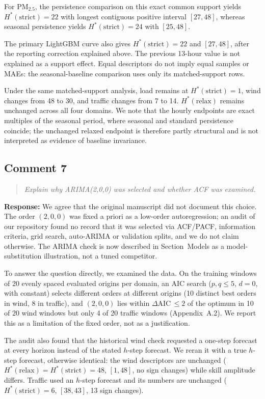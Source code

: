 \documentclass[11pt,a4paper]{article}
\let\originalsubsection\subsection
\renewcommand{\subsection}{\Needspace{9\baselineskip}\originalsubsection}
\newenvironment{reviewcomment}
  {\begin{quote}\itshape}
  {\end{quote}}
\newcommand{\response}{\noindent\textbf{Response:} }
\begin{document}
For PM$_{2.5}$, the persistence comparison on this exact common support yields
$H^*(\mathrm{strict})=22$ with longest contiguous positive interval $[27,48]$,
whereas seasonal persistence yields $H^*(\mathrm{strict})=24$ with $[25,48]$.

The primary LightGBM curve also gives $H^*(\mathrm{strict})=22$ and
$[27,48]$, after the reporting correction explained above. The previous
13-hour value is not explained as a support effect. Equal descriptors
do not imply equal samples or MAEs: the seasonal-baseline comparison
uses only its matched-support rows.

Under the same matched-support analysis, load remains at
$H^*(\mathrm{strict})=1$, wind changes from 48 to 30, and traffic changes from
7 to 14. $H^*(\mathrm{relax})$ remains unchanged across all four domains. We
note that the hourly endpoints are exact multiples of the seasonal period,
where seasonal and standard persistence coincide; the unchanged relaxed
endpoint is therefore partly structural and is not interpreted as evidence of
baseline invariance.


\subsection*{Comment 7}

\begin{reviewcomment}
Explain why ARIMA(2,0,0) was selected and whether ACF was examined.
\end{reviewcomment}

\response
We agree that the original manuscript did not document this choice. The order
$(2,0,0)$ was fixed a priori as a low-order autoregression; an audit of our
repository found no record that it was selected via ACF/PACF, information
criteria, grid search, auto-ARIMA or validation splits, and we do not claim
otherwise. The ARIMA check is now described in Section~Models as a
model-substitution illustration, not a tuned competitor.

To answer the question directly, we examined the data. On the training windows
of 20 evenly spaced evaluated origins per domain, an AIC search
($p,q\le5$, $d=0$, with constant) selects different orders at different origins
(10 distinct best orders in wind, 8 in traffic), and $(2,0,0)$ lies within
$\Delta$AIC$\,\le 2$ of the optimum in 10 of 20 wind windows but only 4 of 20
traffic windows (Appendix~A.2). We report this as a limitation of the fixed
order, not as a justification.

The audit also found that the historical wind check requested a one-step
forecast at every horizon instead of the stated $h$-step forecast. We reran it
with a true $h$-step forecast, otherwise identical: the wind descriptors are
unchanged ($H^*(\mathrm{relax})=H^*(\mathrm{strict})=48$, $[1,48]$, no sign
changes) while skill amplitude differs. Traffic used an $h$-step forecast and its
numbers are unchanged ($H^*(\mathrm{strict})=6$, $[38,43]$, 13 sign changes).
\end{document}
